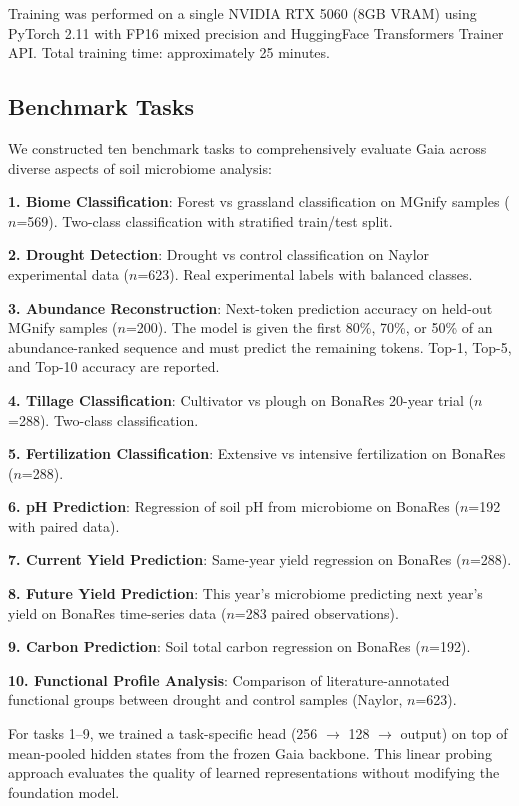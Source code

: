 \documentclass[11pt,a4paper]{article}
\begin{document}
Training was performed on a single NVIDIA RTX 5060 (8GB VRAM) using PyTorch 2.11 with FP16 mixed precision and HuggingFace Transformers Trainer API. Total training time: approximately 25 minutes.

\subsection{Benchmark Tasks}

We constructed ten benchmark tasks to comprehensively evaluate Gaia across diverse aspects of soil microbiome analysis:

\textbf{1. Biome Classification}: Forest vs grassland classification on MGnify samples ($n$=569). Two-class classification with stratified train/test split.

\textbf{2. Drought Detection}: Drought vs control classification on Naylor experimental data ($n$=623). Real experimental labels with balanced classes.

\textbf{3. Abundance Reconstruction}: Next-token prediction accuracy on held-out MGnify samples ($n$=200). The model is given the first 80\%, 70\%, or 50\% of an abundance-ranked sequence and must predict the remaining tokens. Top-1, Top-5, and Top-10 accuracy are reported.

\textbf{4. Tillage Classification}: Cultivator vs plough on BonaRes 20-year trial ($n$=288). Two-class classification.

\textbf{5. Fertilization Classification}: Extensive vs intensive fertilization on BonaRes ($n$=288).

\textbf{6. pH Prediction}: Regression of soil pH from microbiome on BonaRes ($n$=192 with paired data).

\textbf{7. Current Yield Prediction}: Same-year yield regression on BonaRes ($n$=288).

\textbf{8. Future Yield Prediction}: This year's microbiome predicting next year's yield on BonaRes time-series data ($n$=283 paired observations).

\textbf{9. Carbon Prediction}: Soil total carbon regression on BonaRes ($n$=192).

\textbf{10. Functional Profile Analysis}: Comparison of literature-annotated functional groups between drought and control samples (Naylor, $n$=623).

For tasks 1--9, we trained a task-specific head (256 $\rightarrow$ 128 $\rightarrow$ output) on top of mean-pooled hidden states from the frozen Gaia backbone. This linear probing approach evaluates the quality of learned representations without modifying the foundation model.
\end{document}
